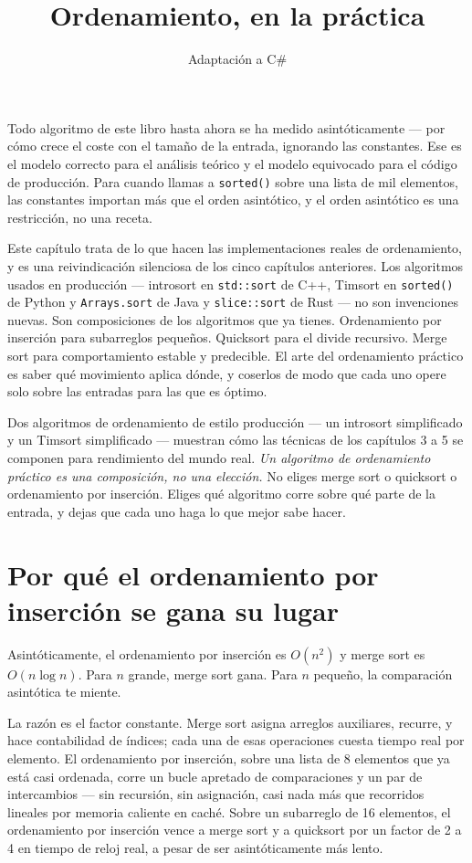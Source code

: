 \documentclass[11pt,a4paper]{article}
\title{Ordenamiento, en la práctica}
\author{Adaptación a C\#}
\date{}
\begin{document}
\maketitle

Todo algoritmo de este libro hasta ahora se ha medido asintóticamente --- por cómo crece el coste con el tamaño de la entrada, ignorando las constantes. Ese es el modelo correcto para el análisis teórico y el modelo equivocado para el código de producción. Para cuando llamas a \texttt{sorted()} sobre una lista de mil elementos, las constantes importan más que el orden asintótico, y el orden asintótico es una restricción, no una receta.

Este capítulo trata de lo que hacen las implementaciones reales de ordenamiento, y es una reivindicación silenciosa de los cinco capítulos anteriores. Los algoritmos usados en producción --- introsort en \texttt{std::sort} de C++, Timsort en \texttt{sorted()} de Python y \texttt{Arrays.sort} de Java y \texttt{slice::sort} de Rust --- no son invenciones nuevas. Son composiciones de los algoritmos que ya tienes. Ordenamiento por inserción para subarreglos pequeños. Quicksort para el divide recursivo. Merge sort para comportamiento estable y predecible. El arte del ordenamiento práctico es saber qué movimiento aplica dónde, y coserlos de modo que cada uno opere solo sobre las entradas para las que es óptimo.

Dos algoritmos de ordenamiento de estilo producción --- un introsort simplificado y un Timsort simplificado --- muestran cómo las técnicas de los capítulos 3 a 5 se componen para rendimiento del mundo real. \emph{Un algoritmo de ordenamiento práctico es una composición, no una elección.} No eliges merge sort o quicksort o ordenamiento por inserción. Eliges qué algoritmo corre sobre qué parte de la entrada, y dejas que cada uno haga lo que mejor sabe hacer.

\section{Por qué el ordenamiento por inserción se gana su lugar}

Asintóticamente, el ordenamiento por inserción es $O(n^2)$ y merge sort es $O(n \log n)$. Para $n$ grande, merge sort gana. Para $n$ pequeño, la comparación asintótica te miente.

La razón es el factor constante. Merge sort asigna arreglos auxiliares, recurre, y hace contabilidad de índices; cada una de esas operaciones cuesta tiempo real por elemento. El ordenamiento por inserción, sobre una lista de 8 elementos que ya está casi ordenada, corre un bucle apretado de comparaciones y un par de intercambios --- sin recursión, sin asignación, casi nada más que recorridos lineales por memoria caliente en caché. Sobre un subarreglo de 16 elementos, el ordenamiento por inserción vence a merge sort y a quicksort por un factor de 2 a 4 en tiempo de reloj real, a pesar de ser asintóticamente más lento.
\end{document}
